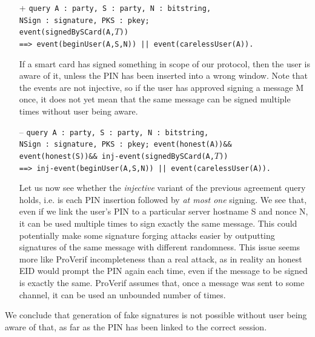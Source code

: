 \begin{itemize}
\item[+] \texttt{query A : party, S : party, N : bitstring,\\
                 NSign : signature, PKS : pkey;\\
                 event(signedBySCard(A,$T$))\\
                 ==> event(beginUser(A,S,N)) || event(carelessUser(A)).}

If a smart card has signed something in scope of our protocol, then the user is aware of it, unless the PIN has been inserted into a wrong window. Note that the events are not injective, so if the user has approved signing a message M once, it does not yet mean that the same message can be signed multiple times without user being aware.

\item[--] \texttt{query A : party, S : party, N : bitstring,\\
                  NSign : signature, PKS : pkey;
                  event(honest(A))\&\& event(honest(S))\&\& inj-event(signedBySCard(A,$T$))\\
                  ==> inj-event(beginUser(A,S,N)) || event(carelessUser(A)).}

Let us now see whether the \emph{injective} variant of the previous agreement query holds, i.e. is each PIN insertion followed by \emph{at most one} signing. We see that, even if we link the user's PIN to a particular server hostname S and nonce N, it can be used multiple times to sign exactly the same message. This could potentially make some signature forging attacks easier by outputting signatures of the same message with different randomness. This issue seems more like ProVerif incompleteness than a real attack, as in reality an honest EID would prompt the PIN again each time, even if the message to be signed is exactly the same. ProVerif assumes that, once a message was sent to some channel, it can be used an unbounded number of times.
\end{itemize}

We conclude that generation of fake signatures is not possible without user being aware of that, as far as the PIN has been linked to the correct session.

